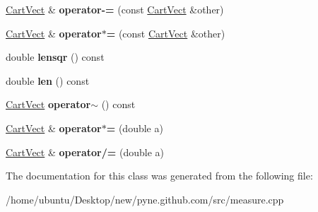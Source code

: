 \begin{DoxyCompactItemize}
\item 
\hyperlink{class_cart_vect}{Cart\+Vect} \& {\bfseries operator-\/=} (const \hyperlink{class_cart_vect}{Cart\+Vect} \&other)\hypertarget{class_cart_vect_a459252305cedf4e95a997bd46a26e9b8}{}\label{class_cart_vect_a459252305cedf4e95a997bd46a26e9b8}

\item 
\hyperlink{class_cart_vect}{Cart\+Vect} \& {\bfseries operator$\ast$=} (const \hyperlink{class_cart_vect}{Cart\+Vect} \&other)\hypertarget{class_cart_vect_ae4d813aaf367f7260870b051062a776f}{}\label{class_cart_vect_ae4d813aaf367f7260870b051062a776f}

\item 
double {\bfseries lensqr} () const \hypertarget{class_cart_vect_a9ab6e8cdf915cde3cf166a6c8c10ce17}{}\label{class_cart_vect_a9ab6e8cdf915cde3cf166a6c8c10ce17}

\item 
double {\bfseries len} () const \hypertarget{class_cart_vect_a4809574b9b0bc24075da36e5b60e6988}{}\label{class_cart_vect_a4809574b9b0bc24075da36e5b60e6988}

\item 
\hyperlink{class_cart_vect}{Cart\+Vect} {\bfseries operator$\sim$} () const \hypertarget{class_cart_vect_aeafa9899c84e5ed65f3217fc1217e7a2}{}\label{class_cart_vect_aeafa9899c84e5ed65f3217fc1217e7a2}

\item 
\hyperlink{class_cart_vect}{Cart\+Vect} \& {\bfseries operator$\ast$=} (double a)\hypertarget{class_cart_vect_a3dec977a311cf363e0ce7f2983370b10}{}\label{class_cart_vect_a3dec977a311cf363e0ce7f2983370b10}

\item 
\hyperlink{class_cart_vect}{Cart\+Vect} \& {\bfseries operator/=} (double a)\hypertarget{class_cart_vect_aaf0806de8642163882bc844e55fa921f}{}\label{class_cart_vect_aaf0806de8642163882bc844e55fa921f}

\end{DoxyCompactItemize}


The documentation for this class was generated from the following file\+:\begin{DoxyCompactItemize}
\item 
/home/ubuntu/\+Desktop/new/pyne.\+github.\+com/src/measure.\+cpp\end{DoxyCompactItemize}
